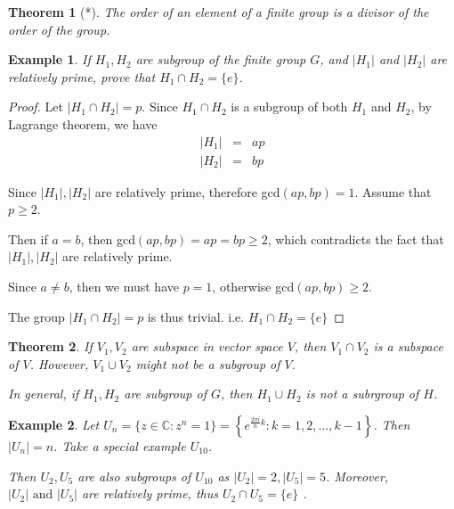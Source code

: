 \documentclass{article}
\theoremstyle{MyNonumberplain}
\theoremstyle{break}
\newtheorem*{proof}{Proof. }
\newcommand{\infixand}{\text{ and }}
\theoremstyle{break}
\newtheorem{theorem}{Theorem}[section]
\newtheorem{example}{Example}[section]
\theoremstyle{break}
\theoremstyle{definition}
\theoremstyle{break}
\begin{document}
\begin{thmbox}
    \begin{theorem}[*]
        The order of an element of a finite group is a divisor of the order of the group.
    \end{theorem}
\end{thmbox}

\begin{expbox}
    \begin{example}
        If $H_1, H_2$ are subgroup of the finite group $G$, and $| H_1 |$ and $| H_2
        |$ are relatively prime, prove that $H_1 \cap H_2 = \{ e \}$.
    \end{example}
    \begin{prfbox}
        \begin{proof}
            Let $|H_1\cap H_2|=p$. Since $H_1\cap H_2$ is a subgroup of both $H_1$ and $H_2$, by Lagrange theorem, we have 
            \begin{eqnarray*}
                |H_1| & = & ap\\
                |H_2| & = & bp
            \end{eqnarray*}

            Since $|H_1|,|H_2|$ are relatively prime, therefore gcd$(ap,bp)=1$. Assume that $p\geq 2$.\bigskip

            Then if $a=b$, then gcd$(ap,bp)=ap=bp\geq2$, which contradicts the fact that $|H_1|,|H_2|$ are relatively prime.\bigskip

            Since $a\neq b$, then we must have $p=1$, otherwise gcd$(ap,bp)\geq2$.\bigskip

            The group $|H_1\cap H_2|=p$ is thus trivial. i.e. $H_1\cap H_2=\{e\}$
        \end{proof}
    \end{prfbox}
\end{expbox}

\begin{thmbox}
    \begin{theorem}
        If $V_1, V_2$ are subspace in vector space $V$, then $V_1 \cap V_2$ is a
        subspace of $V$. However, $V_1 \cup V_2$ might not be a subgroup of $V$.\bigskip

        In general, if $H_1, H_2$ are subgroup of $G$, then $H_1 \cup H_2$ is not a
        subrgroup of $H$.
    \end{theorem}
\end{thmbox}

\begin{expbox}
    \begin{example}
        Let $U_n = \{ z \in \mathbb{C}: z^n = 1 \} = \left\{ e^{\frac{2 \pi i}{n} k} :
        k = 1, 2, \ldots, k - 1 \right\}$. Then $| U_n | = n$. Take a special example
        $U_{10}$.\bigskip

        Then $U_2, U_5$ are also subgroups of $U_{10}$ as $| U_2 | = 2, | U_5 | = 5$.
        Moreover, $| U_2 | \infixand | U_5 |$ are relatively prime, thus $U_2 \cap U_5
        = \{ e \}$ . 
    \end{example}
\end{expbox}
\end{document}
